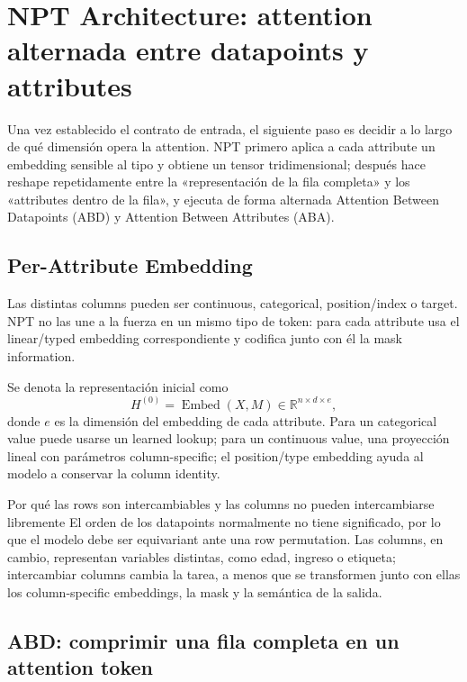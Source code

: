 \section{NPT Architecture: attention alternada entre datapoints y attributes}

Una vez establecido el contrato de entrada, el siguiente paso es decidir a lo largo de qué dimensión opera la attention. NPT primero aplica a cada attribute un embedding sensible al tipo y obtiene un tensor tridimensional; después hace reshape repetidamente entre la «representación de la fila completa» y los «attributes dentro de la fila», y ejecuta de forma alternada Attention Between Datapoints (ABD) y Attention Between Attributes (ABA).

\subsection{Per-Attribute Embedding}

Las distintas columns pueden ser continuous, categorical, position/index o target. NPT no las une a la fuerza en un mismo tipo de token: para cada attribute usa el linear/typed embedding correspondiente y codifica junto con él la mask information.


Se denota la representación inicial como
\[
H^{(0)}=\operatorname{Embed}(X,M)
\in\mathbb{R}^{n\times d\times e},
\]
donde $e$ es la dimensión del embedding de cada attribute. Para un categorical value puede usarse un learned lookup; para un continuous value, una proyección lineal con parámetros column-specific; el position/type embedding ayuda al modelo a conservar la column identity.

\begin{knowledgebox}{Por qué las rows son intercambiables y las columns no pueden intercambiarse libremente}
El orden de los datapoints normalmente no tiene significado, por lo que el modelo debe ser equivariant ante una row permutation. Las columns, en cambio, representan variables distintas, como edad, ingreso o etiqueta; intercambiar columns cambia la tarea, a menos que se transformen junto con ellas los column-specific embeddings, la mask y la semántica de la salida.
\end{knowledgebox}

\subsection{ABD: comprimir una fila completa en un attention token}

